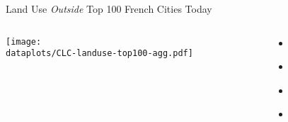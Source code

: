 \documentclass[aspectratio=169]{beamer}
\begin{document}
\begin{frame}[label=CLCmeasure]{Land Use \emph{Outside} Top 100 French Cities Today}

	\begin{columns}
	\begin{column}{0.8\textwidth}
		\begin{adjustbox}{center}
			\texttt{[image: \\dataplots/CLC-landuse-top100-agg.pdf]}
		\end{adjustbox}
	\end{column}
	\begin{column}{0.2\textwidth}
	\begin{itemize}
	\item[] \hyperlink{LandUseMeasureParis}{}
	\item[] \hyperlink{LandUseMeasureLyon}{}
	\item[] \hyperlink{LandUseMeasureMarseille}{}
	\item[] \hyperlink{LandUseMeasureBordeaux}{}
	\end{itemize}
	\end{column}
	
	\end{columns}
\end{frame}


\end{document}
